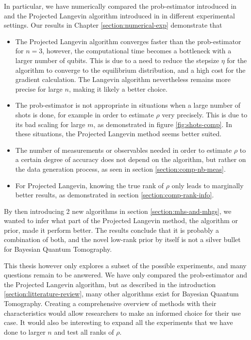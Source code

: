 \documentclass[12pt]{memoir}
\begin{document}
In particular, we have numerically compared the prob-estimator introduced in \cite{MA17} and the Projected Langevin algorithm introduced in \cite{meth:bayesian:Langevin:ACMT2024} in different experimental settings. Our results in Chapter \ref{section:numerical-exp} demonstrate that 
\begin{itemize}
    \item The Projected Langevin algorithm converges faster than the prob-estimator for $n=3$, however, the computational time becomes a bottleneck with a larger number of qubits. This is due to a need to reduce the stepsize $\eta$ for the algorithm to converge to the equilibrium distribution, and a high cost for the gradient calculation. The Langevin algorithm nevertheless remains more precise for large $n$, making it likely a better choice.
    \item The prob-estimator is not appropriate in situations when a large number of shots is done, for example in order to estimate $\rho$ very precisely. This is due to its bad scaling for large $m$, as demonstrated in figure \ref{fig:shots-comp}. In these situations, the Projected Langevin method seems better suited.
    \item The number of measurements or observables needed in order to estimate $\rho$ to a certain degree of accuracy does not depend on the algorithm, but rather on the data generation process, as seen in section \ref{section:comp-nb-meas}.
    \item For Projected Langevin, knowing the true rank of $\rho$ only leads to marginally better results, as demonstrated in section \ref{section:comp-rank-info}.
\end{itemize}
By then introducing 2 new algorithms in section \ref{section:mhs-and-mhgs}, we wanted to infer what part of the Projected Langevin method, the algorithm or prior, made it perform better. The results conclude that it is probably a combination of both, and the novel low-rank prior by itself is not a silver bullet for Bayesian Quantum Tomography.\medbreak 

This thesis however only explores a subset of the possible experiments, and many questions remain to be answered. We have only compared the prob-estimator and the Projected Langevin algorithm, but as described in the introduction \ref{section:litterature-review}, many other algorithms exist for Bayesian Quantum Tomography. Creating a comprehensive overview of methods with their characteristics would allow researchers to make an informed choice for their use case. It would also be interesting to expand all the experiments that we have done to larger $n$ and test all ranks of $\rho$. \medbreak
\end{document}
